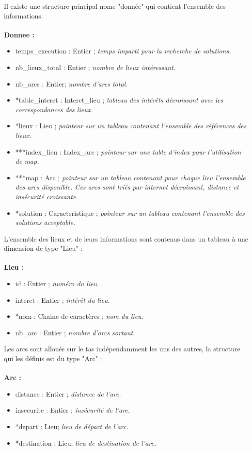     Il existe une structure principal nome "donnée" qui contient l'ensemble des informations.\\
    \\
    \textbf{Donnee :}
    \begin{itemize}
      \item temps\_execution : Entier ; \textit{temps imparti pour la recherche de solutions.}
      \item nb\_lieux\_total : Entier ; \textit{nombre de lieux intéressant.}
      \item nb\_arcs : Entier; \textit{nombre d'arcs total.}
      \item *table\_interet : Interet\_lieu ; \textit{tableau des intérêts décroissant avec les correspondances des lieux.}
      \item *lieux : Lieu ; \textit{pointeur sur un tableau contenant l'ensemble des références des lieux.}
      \item ***index\_lieu : Index\_arc ; \textit{pointeur sur une table d'index pour l'utilisation de map.}
      \item ***map : Arc ; \textit{pointeur sur un tableau contenant pour chaque lieu l'ensemble des arcs disponible. Ces arcs sont triés par internet décroissant, distance et insécurité croissante.}
      \item *solution : Caracteristique ; \textit{pointeur sur un tableau contenant l'ensemble des solutions acceptable.}
    \end{itemize}

    L'ensemble des lieux et de leurs informations sont contenus dans un tableau à une dimension de type "Lieu" :\\
    \\
    \textbf{Lieu :}
    \begin{itemize}
      \item id : Entier ; \textit{numéro du lieu.}
      \item interet : Entier ; \textit{intérêt du lieu.}
      \item *nom : Chaine de caractères ; \textit{nom du lieu.}
      \item nb\_arc : Entier ; \textit{nombre d’arcs sortant.}
    \end{itemize}

    Les arcs sont alloués sur le tas indépendamment les uns des autres, la structure qui les définis est du type "Arc" :\\
    \\
    \textbf{Arc :}
    \begin{itemize}
      \item distance : Entier ; \textit{distance de l’arc.}
      \item insecurite : Entier ; \textit{insécurité de l’arc.}
      \item *depart : Lieu; \textit{lieu de départ de l’arc.}
      \item *destination : Lieu; \textit{lieu de destination de l’arc.}
    \end{itemize}

